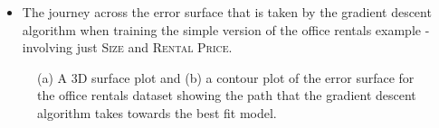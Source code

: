 \documentclass[xcolor={table}]{beamer}
\newcommand{\featN}[1]{\textsc{#1}}
\begin{document}
	
\begin{frame}[plain]
\begin{itemize}
\item The journey across the error surface that is taken by the gradient descent algorithm when training the simple version of the office rentals example - involving just \featN{Size} and \featN{Rental Price}.
\end{itemize}

\begin{figure}[htb]
\begin{center}
\caption{(a) A 3D surface plot and (b) a contour plot of the error surface for the office rentals dataset showing the path that the gradient descent algorithm takes towards the best fit model.}
\label{fig:officeRentalsErrorSurfaceJourney}
\end{center}
\end{figure}
\end{frame}
\end{document}
